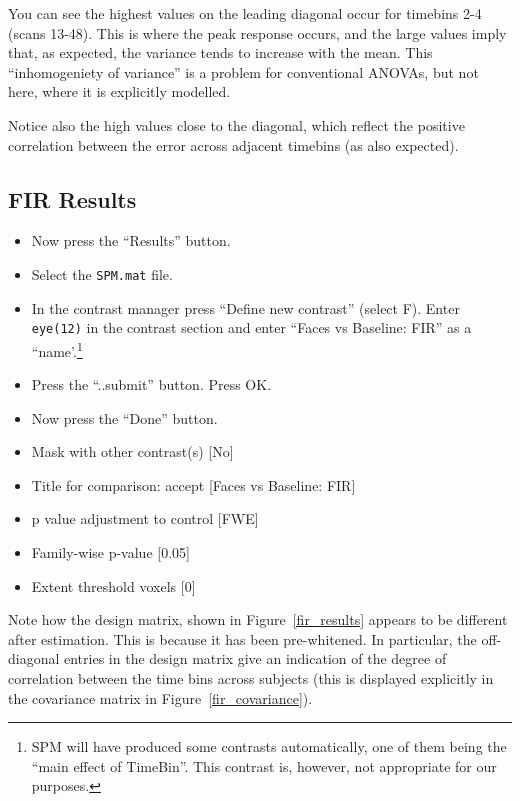 You can see the highest values on the leading diagonal occur for timebins 2-4 (scans 13-48). This is where the peak response occurs, and the large values imply that, as expected, the variance tends to increase with the mean. This ``inhomogeniety of variance'' is a problem for conventional ANOVAs, but not here, where it is explicitly modelled.

Notice also the high values close to the diagonal, which reflect the positive correlation between the error across adjacent timebins (as also expected).

\subsection{FIR Results}

\begin{itemize}
\item Now press the ``Results'' button.
\item Select the \texttt{SPM.mat} file.
\item In the contrast manager press ``Define new contrast'' (select F). Enter \texttt{eye(12)} in the contrast section and enter ``Faces vs Baseline: FIR'' as a ``name'.\footnote{SPM will have produced some contrasts automatically, one of them being the ``main effect of TimeBin''. This contrast is, however, not 
appropriate for our purposes.}
\item Press the ``..submit'' button. Press OK.
\item Now press the ``Done'' button.
\item Mask with other contrast(s) [No]
\item Title for comparison: accept [Faces vs Baseline: FIR]
\item p value adjustment to control [FWE]
\item Family-wise p-value [0.05]
\item Extent threshold {voxels} [0]
\end{itemize}
Note how the design matrix, shown in Figure~\ref{fir_results} appears to be different after estimation. This is because it has been pre-whitened. In particular, the off-diagonal entries in the design matrix give an indication of the degree of correlation between the time bins across subjects (this is displayed explicitly in the covariance matrix in Figure~\ref{fir_covariance}).

